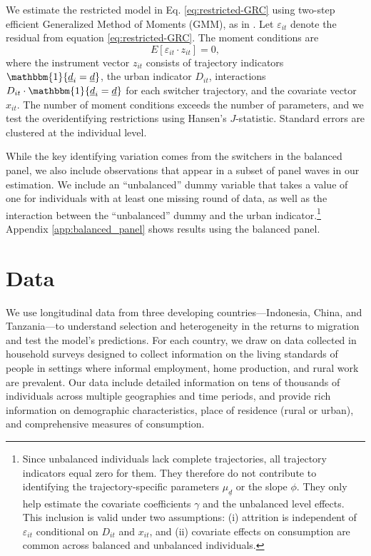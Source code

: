\documentclass[12pt]{article}
\begin{document}
We estimate the restricted model in Eq. \eqref{eq:restricted-GRC} using two-step efficient Generalized Method of Moments (GMM), as in \cite{tjernstromCommentSuri2011}. 
Let $\varepsilon_{it}$ denote the residual from equation \eqref{eq:restricted-GRC}. The moment conditions are
\begin{equation}\label{eq:gmm-moments}
    E\!\left[\varepsilon_{it} \cdot z_{it}\right] = 0,
\end{equation}
where the instrument vector $z_{it}$ consists of trajectory indicators $\mathbbm{1}\{\underline{d}_i = \underline{d}\}$, the urban indicator $D_{it}$, interactions $D_{it} \cdot \mathbbm{1}\{\underline{d}_i = \underline{d}\}$ for each switcher trajectory, and the covariate vector $x_{it}$.
The number of moment conditions exceeds the number of parameters, and we test the overidentifying restrictions using Hansen's $J$-statistic.
Standard errors are clustered at the individual level.

While the key identifying variation comes from the switchers in the balanced panel, we also include observations that appear in a subset of panel waves in our estimation.
We include an ``unbalanced'' dummy variable that takes a value of one for individuals with at least one missing round of data, as well as the interaction between the ``unbalanced'' dummy and the urban indicator.\footnote{Since unbalanced individuals lack complete trajectories, all trajectory indicators equal zero for them. They therefore do not contribute to identifying the trajectory-specific parameters $\mu_{\underline{d}}$ or the slope $\phi$. They only help estimate the covariate coefficients $\gamma$ and the unbalanced level effects. This inclusion is valid under two assumptions: (i) attrition is independent of $\varepsilon_{it}$ conditional on $D_{it}$ and $x_{it}$, and (ii) covariate effects on consumption are common across balanced and unbalanced individuals.}
Appendix \ref{app:balanced_panel} shows results using the balanced panel.


\section{Data}\label{sec:data}

We use longitudinal data from three developing countries---Indonesia, China, and Tanzania---to understand selection and heterogeneity in the returns to migration and test the model's predictions.
For each country, we draw on data collected in household surveys designed to collect information on the living standards of people in settings where informal employment, home production, and rural work are prevalent. 
Our data include detailed information on tens of thousands of individuals across multiple geographies and time periods, and provide rich information on demographic characteristics,  place of residence (rural or urban), and comprehensive measures of consumption.%
\end{document}
